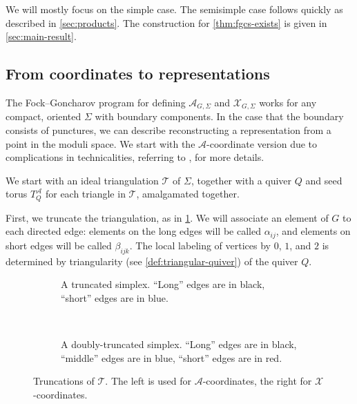 \documentclass{amsart}
\theoremstyle{plain}
\theoremstyle{definition}
\theoremstyle{remark}
\newcommand{\seedAtorus}{T^{\mathcal{A}}}
\newcommand{\triang}{\mathcal{T}}
\begin{document}
  We will mostly focus on the simple case. The semisimple case follows
  quickly as described in \cref{sec:products}. The construction for
  \cref{thm:fgcs-exists} is given in \cref{sec:main-result}.

  \subsection{From coordinates to representations}

  \label{sec:coords-to-representations}

  The Fock--Goncharov program for defining $\mathcal{A}_{G,\Sigma}$ and
  $\mathcal{X}_{G,\Sigma}$ works for any compact, oriented $\Sigma$ with
  boundary components. In the case that the boundary consists of
  punctures, we can describe reconstructing a representation from a
  point in the moduli space. We start with the $\mathcal{A}$-coordinate
  version due to complications in technicalities, referring to
  \cite[Section~8]{fockgoncharov2006}, \cite[Section~6]{zickert2016} for
  more details.

  We start with an ideal triangulation $\triang$ of $\Sigma$, together
  with a quiver $Q$ and seed torus $\seedAtorus_Q$ for each triangle in
  $\triang$, amalgamated together.

  First, we truncate the triangulation, as in
  \cref{fig:truncated-simplex}. We will associate an element of $G$ to
  each directed edge: elements on the long edges will be called
  $\alpha_{ij}$, and elements on short edges will be called
  $\beta_{ijk}$. The local labeling of vertices by $0$, $1$, and $2$ is
  determined by triangularity (see \cref{def:triangular-quiver}) of the
  quiver $Q$.

  \begin{figure}[h]
    \centering
    \begin{subfigure}[t]{0.40\textwidth}
      \centering
      

      \caption{A truncated simplex. ``Long'' edges are in black,
        ``short'' edges are in blue.
        \label{fig:truncated-simplex}
      }
    \end{subfigure}
    ~ \hspace{0.05\textwidth} ~
    \begin{subfigure}[t]{0.40\textwidth}
      \centering
      

      \caption{A doubly-truncated simplex. ``Long'' edges are in black,
        ``middle'' edges are in blue, ``short'' edges are in red.
        \label{fig:doubly-truncated-simplex}
      }
    \end{subfigure}
    \caption{Truncations of $\triang$. The left is used for
      $\mathcal{A}$-coordinates, the right for
      $\mathcal{X}$-coordinates.}
  \end{figure}
\end{document}
